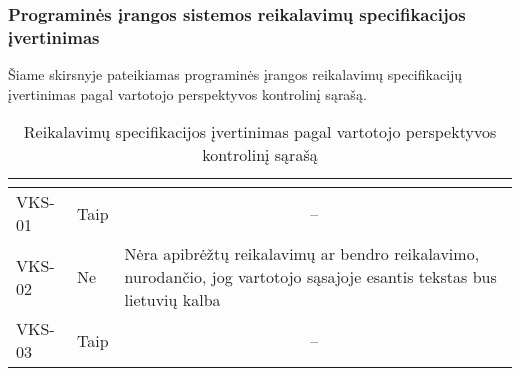 \documentclass{VUMIFPSkursinis}
\begin{document}
\subsubsection{Programinės įrangos sistemos reikalavimų specifikacijos įvertinimas}
Šiame skirsnyje pateikiamas programinės įrangos reikalavimų specifikacijų įvertinimas pagal vartotojo perspektyvos kontrolinį sąrašą.
\begin{center}

	\begin{longtable}{|C{2cm}|L{2.5cm}|L{10cm}|}

		\caption{Reikalavimų specifikacijos įvertinimas pagal vartotojo perspektyvos kontrolinį sąrašą}
		\label{table:VKS}

		\\ \hline
		 &
		 &
		\\ \hline
		VKS-01                                          &
		Taip                                            &
		                                                                                                                                                                                                                                                      \\ \hline
		VKS-02                                          &
		Ne                                              &
		Nėra apibrėžtų reikalavimų ar bendro reikalavimo, nurodančio, jog vartotojo sąsajoje esantis tekstas bus lietuvių kalba                                                                                                                                                       \\ \hline
		VKS-03                                          &
		Taip                                            &
		                                                                                                                                                                                                                                                      \\ \hline

\end{longtable}
\end{center}
\end{document}
